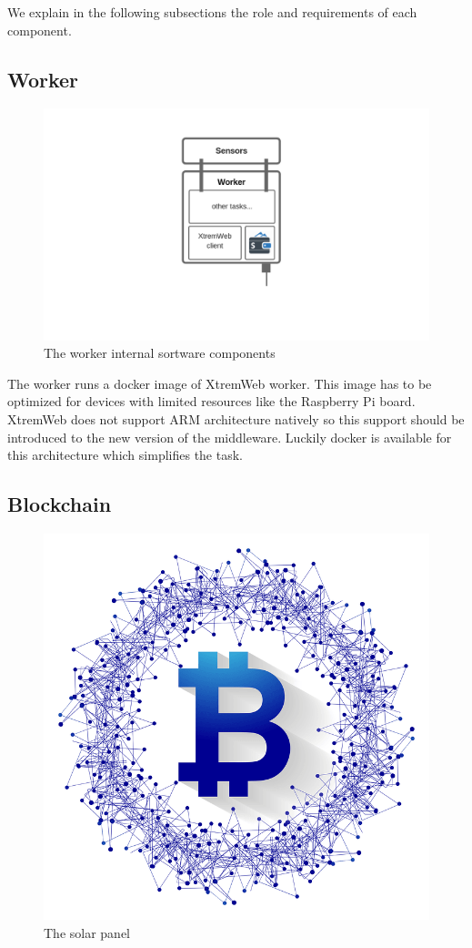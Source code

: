     We explain in the following subsections the role and requirements of each
    component.

    \subsection{Worker}

        \begin{figure}[!h]\centering
            \includegraphics[width=.9\columnwidth]{5-Design/figs/worker.png}
            \caption{The worker internal sortware components}
        \end{figure}


        The worker runs a docker image of XtremWeb worker. This image has to be optimized for devices with
        limited resources like the Raspberry Pi board.
        XtremWeb does not support ARM architecture natively so this support should be introduced
        to the new version of the middleware. Luckily docker is available for this architecture which simplifies
        the task.

    \subsection{Blockchain}
    
        \begin{figure}[!h]\centering
            \includegraphics[width=.3\columnwidth]{5-Design/figs/blockchain-logo.png}
            \caption{The solar panel}
        \end{figure}

